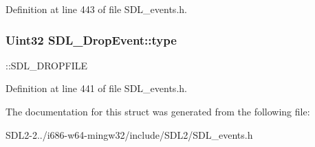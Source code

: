 Definition at line 443 of file S\+D\+L\+\_\+events.\+h.

\hypertarget{structSDL__DropEvent_a5ea27cfaa5f8d4940e9a69b68b3cc035}{
\subsubsection[{type}]{\setlength{\rightskip}{0pt plus 5cm}Uint32 S\+D\+L\+\_\+\+Drop\+Event\+::type}}\label{structSDL__DropEvent_a5ea27cfaa5f8d4940e9a69b68b3cc035}
\+::\+S\+D\+L\+\_\+\+D\+R\+O\+P\+F\+I\+L\+E 

Definition at line 441 of file S\+D\+L\+\_\+events.\+h.



The documentation for this struct was generated from the following file\+:\begin{DoxyCompactItemize}
\item 
S\+D\+L2-\/2../i686-\/w64-\/mingw32/include/\+S\+D\+L2/S\+D\+L\+\_\+events.\+h\end{DoxyCompactItemize}
